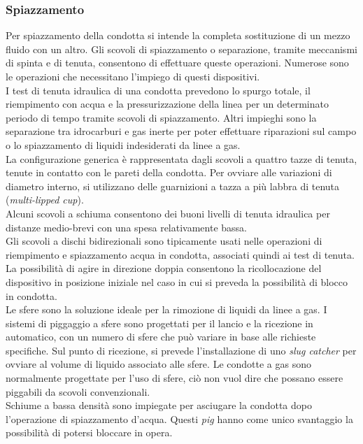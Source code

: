 \subsubsection{Spiazzamento}
Per spiazzamento della condotta si intende la completa sostituzione di un mezzo fluido con un altro. Gli scovoli di spiazzamento o separazione, tramite meccanismi di spinta e di tenuta, consentono di effettuare queste operazioni. Numerose sono le operazioni che necessitano l'impiego di questi dispositivi.\\
I test di tenuta idraulica di una condotta prevedono lo spurgo totale, il riempimento con acqua e la pressurizzazione della linea per un determinato periodo di tempo tramite scovoli di spiazzamento. Altri impieghi sono la separazione tra idrocarburi e gas inerte per poter effettuare riparazioni sul campo o lo spiazzamento di liquidi indesiderati da linee a gas.\\
La configurazione generica è rappresentata dagli scovoli a quattro tazze di tenuta, tenute in contatto con le pareti della condotta. Per ovviare alle variazioni di diametro interno, si utilizzano delle guarnizioni a tazza a più labbra di tenuta (\textit{multi-lipped cup}).\\
Alcuni scovoli a schiuma consentono dei buoni livelli di tenuta idraulica per distanze medio-brevi con una spesa relativamente bassa.\\
Gli scovoli a dischi bidirezionali sono tipicamente usati nelle operazioni di riempimento e spiazzamento acqua in condotta, associati quindi ai test di tenuta. La possibilità di agire in direzione doppia consentono la ricollocazione del dispositivo in posizione iniziale nel caso in cui si preveda la possibilità di blocco in condotta.\\
Le sfere sono la soluzione ideale per la rimozione di liquidi da linee a gas. I sistemi di piggaggio a sfere sono progettati per il lancio e la ricezione in automatico, con un numero di sfere che può variare in base alle richieste specifiche. Sul punto di ricezione, si prevede l'installazione di uno \textit{slug catcher} per ovviare al volume di liquido associato alle sfere. Le condotte a gas sono normalmente progettate per l'uso di sfere, ciò non vuol dire che possano essere piggabili da scovoli convenzionali.\\
Schiume a bassa densità sono impiegate per asciugare la condotta dopo l'operazione di spiazzamento d'acqua. Questi \textit{pig} hanno come unico svantaggio la possibilità di potersi bloccare in opera.\\
 
